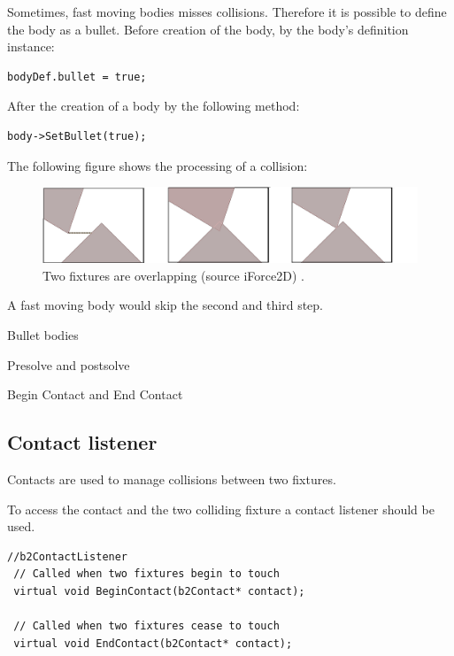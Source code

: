 \documentclass[10pt,a4paper,DIV=11]{scrreprt}
\begin{document}
Sometimes, fast moving bodies misses collisions. Therefore it is possible to define the body as a bullet. Before creation of the body, by the body's definition instance:

\begin{lstlisting}[caption={Define fixture as bullet before creation},label=lst:fixture-bullet-before]
bodyDef.bullet = true;
\end{lstlisting}

After the creation of a body by the following method:

\begin{lstlisting}[caption={Define fixture as bullet after creation},label=lst:fixture-bullet-after]
body->SetBullet(true);
\end{lstlisting}

The following figure shows the processing of a collision:

\begin{center}
	\begin{figure}[H]
		\centering
		\includegraphics[width=1.0\textwidth,scale=1.0]{files/fixtures-overlap.png}
		\caption{Two fixtures are overlapping (source iForce2D) \cite{box2d-iforce}.}
		\label{fig:fixture-overlap}
	\end{figure}
\end{center}

A fast moving body would skip the second and third step.

Bullet bodies

Presolve and postsolve

Begin Contact and End Contact

\subsection{Contact listener}
Contacts are used to manage collisions between two fixtures.

To access the contact and the two colliding fixture a contact listener should be used.




\begin{lstlisting}[caption={Begin Contact and End-Contact method},label=lst:collision-contact]
 //b2ContactListener
 // Called when two fixtures begin to touch
 virtual void BeginContact(b2Contact* contact);

 // Called when two fixtures cease to touch
 virtual void EndContact(b2Contact* contact);
\end{lstlisting}
\end{document}
